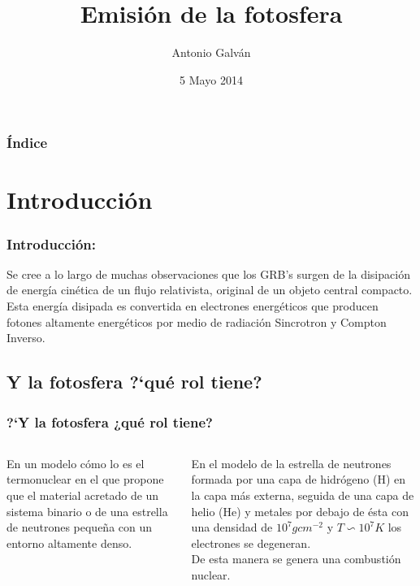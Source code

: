\documentclass{beamer}
\title[Emisi\'on de la fotosfera]{\textbf{Emisi\'on de la fotosfera}}
\author{Antonio Galv\'an}
\date{5 Mayo 2014}
\institute{Instituto de Astronom\'ia\\ Facultad
 de Ciencias\\ U.N.A.M.}
\begin{document}
\begin{frame}
\titlepage
\end{frame}

\begin{frame}
\frametitle{\'Indice}
\tableofcontents[pausesections]
\end{frame}

\section{Introducci\'on}

\begin{frame}
\frametitle{Introducci\'on:} 
Se cree a lo largo de muchas observaciones que los GRB's surgen 
de la disipaci\'on de energ\'ia cin\'etica de un flujo relativista,
 original de un objeto central compacto.\\
Esta energ\'ia disipada es convertida en electrones energ\'eticos que
producen fotones altamente energ\'eticos por medio de radiaci\'on Sincrotron y 
Compton Inverso.
\end{frame}

\subsection{Y la fotosfera ?`qu\'e rol tiene?}
\begin{frame}
\frametitle{?`Y la fotosfera ¿qu\'e rol tiene?}
	\begin{columns}
	
		\begin{column}{5cm}
		En un modelo c\'omo lo es el termonuclear en el que propone que el material acretado
		de un sistema binario o de una estrella de neutrones peque\~na con un entorno altamente
		denso.
		\end{column}
		
		\begin{column}{5cm}
		En el modelo de la estrella de neutrones formada por una capa de hidr\'ogeno (H) en la capa
		m\'as externa, seguida de una capa de helio (He) y metales por debajo de \'esta con una densidad
		de $10^{7}g cm^{-2}$ y $T\backsim 10^{7}K $ los electrones se degeneran.\\
		De esta manera se genera una combusti\'on nuclear.
		\end{column}	
	\end{columns}
\end{frame}
\end{document}
